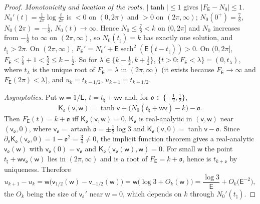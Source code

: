 \documentclass[11pt,a4paper]{article}
\numberwithin{equation}{section}
\theoremstyle{definition}
\theoremstyle{remark}
\begin{document}
\begin{proof}
\emph{Monotonicity and location of the roots.} $|\tanh|\le1$ gives $|F_{\mathsf E}-N_0|\le1$. $N_0'(t)=\frac1{2\pi}\log\frac t{2\pi}$ is $<0$ on $(0,2\pi)$ and $>0$ on $(2\pi,\infty)$; $N_0(0^+)=\frac78$, $N_0(2\pi)=-\frac18$, $N_0(t)\to\infty$. Hence $N_0\le\frac78<k$ on $(0,2\pi]$ and $N_0$ increases from $-\frac18$ to $\infty$ on $(2\pi,\infty)$, so $N_0(t_\natural)=k$ has exactly one solution, and $t_\natural>2\pi$. On $(2\pi,\infty)$, $F_{\mathsf E}'=N_0'+\mathsf E\operatorname{sech}^2(\mathsf E(t-t_\natural))>0$. On $(0,2\pi]$, $F_{\mathsf E}<\frac78+1<\frac52\le k-\frac12$. So for $\lambda\in\{k-\frac12,k+\frac12\}$, $\{t>0:F_{\mathsf E}<\lambda\}=(0,t_\lambda)$, where $t_\lambda$ is the unique root of $F_{\mathsf E}=\lambda$ in $(2\pi,\infty)$ (it exists because $F_{\mathsf E}\to\infty$ and $F_{\mathsf E}(2\pi)<\lambda$), and $u_k=t_{k-1/2}$, $u_{k+1}=t_{k+1/2}$.

\emph{Asymptotics.} Put $\mathsf w=1/\mathsf E$, $t=t_\natural+\mathsf w\mathsf v$ and, for $\mathfrak o\in\{-\frac12,\frac12\}$,
\begin{equation}
\mathsf K_{\mathfrak o}(\mathsf v,\mathsf w)=\tanh\mathsf v+\bigl(N_0(t_\natural+\mathsf w\mathsf v)-k\bigr)-\mathfrak o .
\end{equation}
Then $F_{\mathsf E}(t)=k+\mathfrak o$ iff $\mathsf K_{\mathfrak o}(\mathsf v,\mathsf w)=0$. $\mathsf K_{\mathfrak o}$ is real-analytic in $(\mathsf v,\mathsf w)$ near $(\mathsf v_{\mathfrak o},0)$, where $\mathsf v_{\mathfrak o}=\operatorname{artanh}\mathfrak o=\pm\frac12\log3$ and $\mathsf K_{\mathfrak o}(\mathsf v,0)=\tanh\mathsf v-\mathfrak o$. Since $\partial_{\mathsf v}\mathsf K_{\mathfrak o}(\mathsf v_{\mathfrak o},0)=1-\mathfrak o^2=\frac34\ne0$, the implicit function theorem gives a real-analytic $\mathsf v_{\mathfrak o}(\mathsf w)$ with $\mathsf v_{\mathfrak o}(0)=\mathsf v_{\mathfrak o}$ and $\mathsf K_{\mathfrak o}(\mathsf v_{\mathfrak o}(\mathsf w),\mathsf w)=0$. For small $\mathsf w$ the point $t_\natural+\mathsf w\mathsf v_{\mathfrak o}(\mathsf w)$ lies in $(2\pi,\infty)$ and is a root of $F_{\mathsf E}=k+\mathfrak o$, hence is $t_{k+\mathfrak o}$ by uniqueness. Therefore
\begin{equation}
u_{k+1}-u_k=\mathsf w\bigl(\mathsf v_{1/2}(\mathsf w)-\mathsf v_{-1/2}(\mathsf w)\bigr)=\mathsf w\bigl(\log3+O_k(\mathsf w)\bigr)=\frac{\log 3}{\mathsf E}+O_k\!\bigl(\mathsf E^{-2}\bigr),
\end{equation}
the $O_k$ being the size of $\mathsf v_{\mathfrak o}'$ near $\mathsf w=0$, which depends on $k$ through $N_0'(t_\natural)$.
\end{proof}
\end{document}
